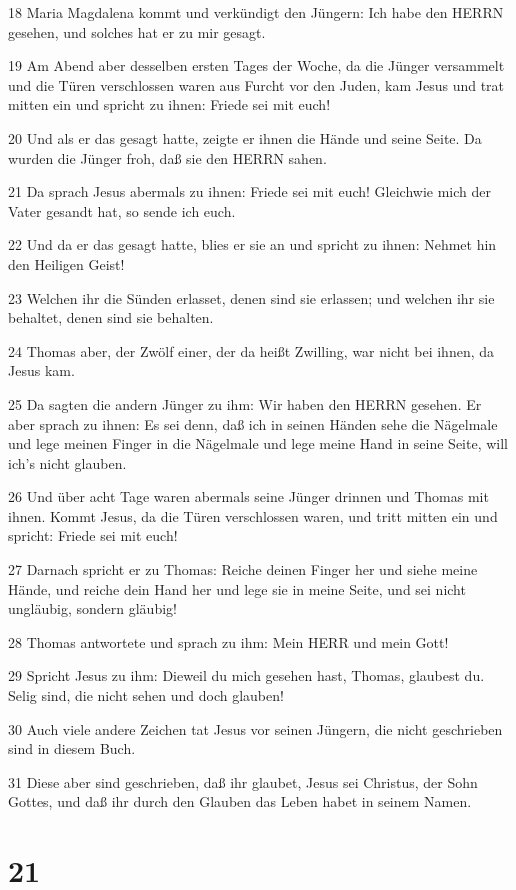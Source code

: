 \par 18 Maria Magdalena kommt und verkündigt den Jüngern: Ich habe den HERRN gesehen, und solches hat er zu mir gesagt.
\par 19 Am Abend aber desselben ersten Tages der Woche, da die Jünger versammelt und die Türen verschlossen waren aus Furcht vor den Juden, kam Jesus und trat mitten ein und spricht zu ihnen: Friede sei mit euch!
\par 20 Und als er das gesagt hatte, zeigte er ihnen die Hände und seine Seite. Da wurden die Jünger froh, daß sie den HERRN sahen.
\par 21 Da sprach Jesus abermals zu ihnen: Friede sei mit euch! Gleichwie mich der Vater gesandt hat, so sende ich euch.
\par 22 Und da er das gesagt hatte, blies er sie an und spricht zu ihnen: Nehmet hin den Heiligen Geist!
\par 23 Welchen ihr die Sünden erlasset, denen sind sie erlassen; und welchen ihr sie behaltet, denen sind sie behalten.
\par 24 Thomas aber, der Zwölf einer, der da heißt Zwilling, war nicht bei ihnen, da Jesus kam.
\par 25 Da sagten die andern Jünger zu ihm: Wir haben den HERRN gesehen. Er aber sprach zu ihnen: Es sei denn, daß ich in seinen Händen sehe die Nägelmale und lege meinen Finger in die Nägelmale und lege meine Hand in seine Seite, will ich's nicht glauben.
\par 26 Und über acht Tage waren abermals seine Jünger drinnen und Thomas mit ihnen. Kommt Jesus, da die Türen verschlossen waren, und tritt mitten ein und spricht: Friede sei mit euch!
\par 27 Darnach spricht er zu Thomas: Reiche deinen Finger her und siehe meine Hände, und reiche dein Hand her und lege sie in meine Seite, und sei nicht ungläubig, sondern gläubig!
\par 28 Thomas antwortete und sprach zu ihm: Mein HERR und mein Gott!
\par 29 Spricht Jesus zu ihm: Dieweil du mich gesehen hast, Thomas, glaubest du. Selig sind, die nicht sehen und doch glauben!
\par 30 Auch viele andere Zeichen tat Jesus vor seinen Jüngern, die nicht geschrieben sind in diesem Buch.
\par 31 Diese aber sind geschrieben, daß ihr glaubet, Jesus sei Christus, der Sohn Gottes, und daß ihr durch den Glauben das Leben habet in seinem Namen.

\chapter{21}

